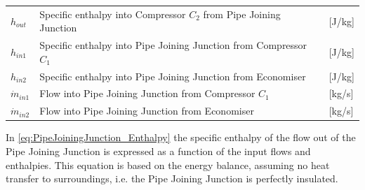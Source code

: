 \begin{center}
	\begin{tabular}{l p{10cm} l}
		$h_{out}$ 	& Specific enthalpy into Compressor $ C_2 $ from Pipe Joining Junction 		& [\si{J}/\si{kg}]\\ 
		$h_{in1}$ 	& Specific enthalpy into Pipe Joining Junction from Compressor $ C_1 $  		& [\si{J}/\si{kg}]\\ 
		$h_{in2}$ 	& Specific enthalpy into Pipe Joining Junction from Economiser   			& [\si{J}/\si{kg}]\\ 
		$\dot{m}_{in1}$ & Flow into Pipe Joining Junction from Compressor $ C_1 $ 		& [\si{kg}/\si{s}]\\
		$\dot{m}_{in2}$ & Flow into Pipe Joining Junction from Economiser 				& [\si{kg}/\si{s}]\\
	\end{tabular}
\end{center}
In \cref{eq:PipeJoiningJunction_Enthalpy} the specific enthalpy of the flow out of the Pipe Joining Junction is expressed as a function of the input flows and enthalpies. This equation is based on the energy balance, assuming no heat transfer to surroundings, i.e. the Pipe Joining Junction is perfectly insulated.



